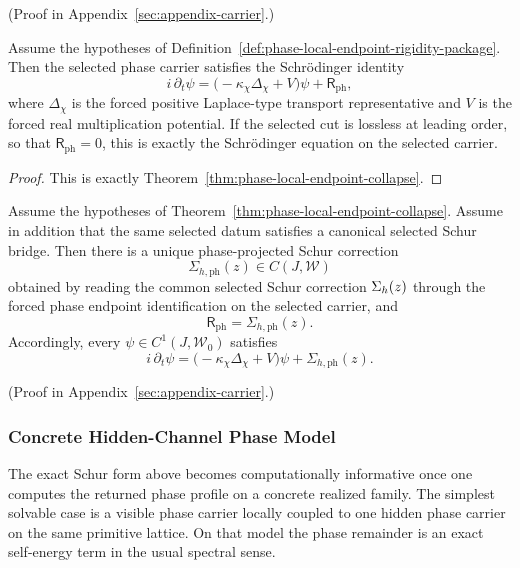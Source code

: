 (Proof in Appendix~\ref{sec:appendix-carrier}.)

\begin{corollary}
\label{cor:recognizable-schrodinger-identity}
Assume the hypotheses of
Definition~\ref{def:phase-local-endpoint-rigidity-package}. Then the selected
phase carrier satisfies the Schr\"odinger identity
\[
i\,\partial_t\psi
=
\bigl(-\kappa_{\chi}\Delta_{\chi}+V\bigr)\psi
+
\mathsf R_{\mathrm{ph}},
\]
where \(\Delta_{\chi}\) is the forced positive Laplace-type transport
representative and \(V\) is the forced real multiplication potential. If the
selected cut is lossless at leading order, so that \(\mathsf R_{\mathrm{ph}}=0\),
this is exactly the Schr\"odinger equation on the selected carrier.
\end{corollary}

\begin{proof}
This is exactly Theorem~\ref{thm:phase-local-endpoint-collapse}.
\end{proof}

\begin{corollary}
\label{cor:phase-schur-remainder-identity}
Assume the hypotheses of
Theorem~\ref{thm:phase-local-endpoint-collapse}. Assume in addition that the
same selected datum satisfies a canonical selected Schur bridge. Then there is
a unique phase-projected Schur correction
\[
\Sigma_{h,\mathrm{ph}}(z)\in C(J,\mathcal W)
\]
obtained by reading the common selected Schur correction \(\Sigma_{h}(z)\)
through the forced phase endpoint identification on the selected carrier, and
\[
\mathsf R_{\mathrm{ph}}=\Sigma_{h,\mathrm{ph}}(z).
\]
Accordingly, every \(\psi\in C^1(J,\mathcal W_0)\) satisfies
\[
i\,\partial_t\psi
=
\bigl(-\kappa_{\chi}\Delta_{\chi}+V\bigr)\psi
+
\Sigma_{h,\mathrm{ph}}(z).
\]
\end{corollary}

(Proof in Appendix~\ref{sec:appendix-carrier}.)

\subsubsection{Concrete Hidden-Channel Phase Model}

The exact Schur form above becomes computationally informative once one
computes the returned phase profile on a concrete realized family. The
simplest solvable case is a visible phase carrier locally coupled to one
hidden phase carrier on the same primitive lattice. On that model the
phase remainder is an exact self-energy term in the usual spectral sense.

